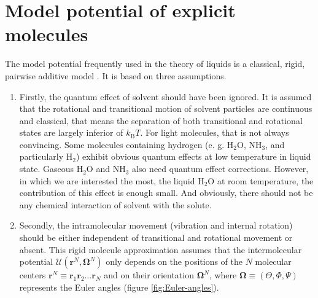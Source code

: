 \section{Model potential of explicit molecules}

The model potential frequently used in the theory of liquids is a
classical, rigid, pairwise additive model \citep{Hensen-McDonald,Gray-Gubbins}.
It is based on three assumptions. 
\begin{enumerate}
\item Firstly, the quantum effect of solvent should have been ignored. It
is assumed that the rotational and transitional motion of solvent
particles are continuous and classical, that means the separation
of both transitional and rotational states are largely inferior of
$k_{\mathrm{B}}T$. For light molecules, that is not always convincing.
Some molecules containing hydrogen (e. g. $\mathrm{H_{2}O}$, $\mathrm{NH_{3}}$,
and particularly $\mathrm{H_{2}}$) exhibit obvious quantum effects
at low temperature in liquid state. Gaseous $\mathrm{H_{2}O}$ and
$\mathrm{NH_{3}}$ also need quantum effect corrections. However,
in which we are interested the most, the liquid $\mathrm{H_{2}O}$
at room temperature, the contribution of this effect is enough small.
And obviously, there should not be any chemical interaction of solvent
with the solute.
\item Secondly, the intramolecular movement (vibration and internal rotation) should
be either independent of transitional and rotational movement or absent.
This rigid molecule approximation assumes that the intermolecular
potential $\mathcal{U}(\mathbf{r}^{N},\mathbf{\Omega}^{N})$ only
depends on the positions of the $N$ molecular centers $\mathbf{r}^{N}\equiv\mathbf{r}_{1}\mathbf{r}_{2}\ldots\mathbf{r}_{N}$
and on their orientation $\mathbf{\Omega}^{N}$, where $\mathbf{\Omega}\equiv(\Theta,\Phi,\Psi)$
represents the Euler angles (figure \ref{fig:Euler-angles}).



\end{enumerate}
